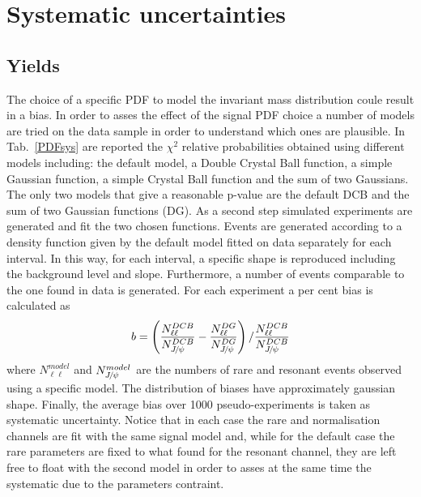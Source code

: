 \chapter{Systematic uncertainties}
\label{sec:Lb_sys}

\section{Yields}
\label{sec:Lb_yield_sys}

The choice of a specific PDF to model the invariant mass distribution coule result
in a bias. In order to asses the effect of the signal PDF choice a number of models
are tried on the \Lb\to\jpsi\Lz data sample in order to understand which ones are plausible.
In Tab.~\ref{PDFsys} are reported the $\chi^2$ relative probabilities obtained using different
models including: the default model, a Double Crystal Ball function, a simple Gaussian function,
a simple Crystal Ball function and the sum of two Gaussians. The only two models that
give a reasonable p-value are the default DCB and the sum of two Gaussian functions (DG).
As a second step simulated experiments are generated and fit the two chosen functions.
Events are generated according to a density function given by the default model fitted
on data separately for each \qsq interval. In this way, for each \qsq interval, a specific
shape is reproduced including the background level and slope. Furthermore, a number 
of events comparable to the one found in data is generated. For each experiment a per cent bias
is calculated as
%
\begin{equation}
b = \left(\frac{N^{DCB}_{\ell\ell}}{N^{DCB}_{\jpsi}} - \frac{N^{DG}_{\ell\ell}}{N^{DG}_{\jpsi}}\right) / \frac{N^{DCB}_{\ell\ell}}{N^{DCB}_{\jpsi}}
\end{equation}
%
where $N^{model}_{\ell\ell}$ and $N^{model}_{\jpsi}$ are the numbers of rare and resonant events
observed using a specific model. The distribution of biases have approximately gaussian shape.
Finally, the average bias over 1000 pseudo-experiments is taken
as systematic uncertainty. Notice that in each case the rare and normalisation channels are fit
with the same signal model and, while for the default case the rare parameters are fixed to what found
for the resonant channel, they are left free to float with the second model in order to asses
at the same time the systematic due to the parameters contraint.

